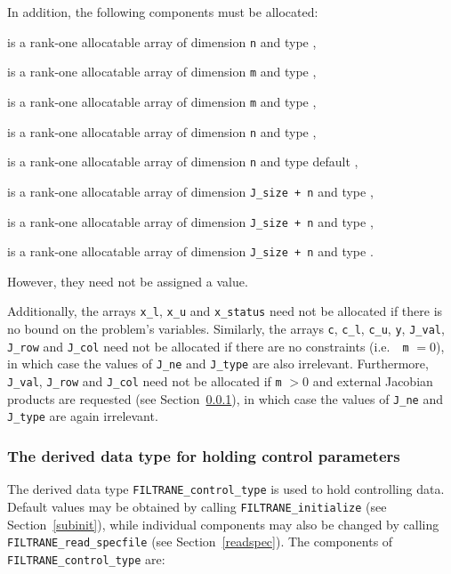 \documentclass{galahad}
\newcommand{\packagename}{FILTRANE}
\begin{document}
\noindent
In addition, the following components must be allocated:
\begin{description}
 is a rank-one allocatable array of dimension {\tt n} and type 
\integer,

 is a rank-one allocatable array of dimension {\tt m} and type 
\realdp,

 is a rank-one allocatable array of dimension {\tt m} and type 
\realdp,

 is a rank-one allocatable array of dimension {\tt n} and type 
\realdp,

 is a rank-one allocatable array of dimension {\tt n} and type 
default \logical,

 is a rank-one allocatable array of dimension {\tt J\_size + n} and
type \realdp,

 is a rank-one allocatable array of dimension {\tt J\_size + n} and
type \integer,

 is a rank-one allocatable array of dimension {\tt J\_size + n} and
type \integer.
\end{description}
However, they need not be assigned a value.

\noindent
Additionally, the arrays {\tt x\_l}, {\tt x\_u} and {\tt x\_status} need not
be allocated if there is no bound on the problem's variables.  Similarly, the
arrays {\tt c}, {\tt c\_l}, {\tt c\_u}, {\tt y}, {\tt J\_val}, {\tt J\_row}
and {\tt J\_col} need not be allocated if there are no constraints (i.e.\ {\tt
m} $=0$), in which case the values of {\tt J\_ne} and {\tt J\_type} are also
irrelevant. Furthermore, {\tt J\_val}, {\tt J\_row} and {\tt J\_col} need not
be allocated if {\tt m} $>0$ and external Jacobian products are requested (see
Section~\ref{typecontrol}), in which case the values of {\tt J\_ne} and {\tt
J\_type} are again irrelevant.


\subsubsection{The derived data type for holding control 
 parameters}\label{typecontrol}
The derived data type 
{\tt \packagename\_control\_type} 
is used to hold controlling data. Default values may be obtained by calling 
{\tt \packagename\_initialize} (see Section~\ref{subinit}),
while individual components may also be changed by calling 
{\tt \packagename\_read\-\_specfile}
(see Section~\ref{readspec}). 
The components of 
{\tt \packagename\_control\_type} 
are:
\end{document}
